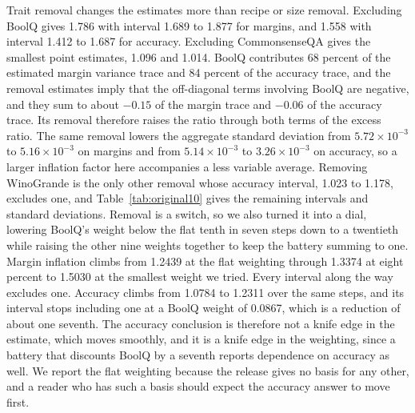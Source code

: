 Trait removal changes the estimates more than recipe or size removal. Excluding BoolQ gives 1.786 with interval 1.689 to 1.877 for margins, and 1.558 with interval 1.412 to 1.687 for accuracy. Excluding CommonsenseQA gives the smallest point estimates, 1.096 and 1.014. BoolQ contributes 68 percent of the estimated margin variance trace and 84 percent of the accuracy trace, and the removal estimates imply that the off-diagonal terms involving BoolQ are negative, and they sum to about $-0.15$ of the margin trace and $-0.06$ of the accuracy trace. Its removal therefore raises the ratio through both terms of the excess ratio. The same removal lowers the aggregate standard deviation from $5.72\times10^{-3}$ to $5.16\times10^{-3}$ on margins and from $5.14\times10^{-3}$ to $3.26\times10^{-3}$ on accuracy, so a larger inflation factor here accompanies a less variable average. Removing WinoGrande is the only other removal whose accuracy interval, 1.023 to 1.178, excludes one, and Table~\ref{tab:original10} gives the remaining intervals and standard deviations. Removal is a switch, so we also turned it into a dial, lowering BoolQ's weight below the flat tenth in seven steps down to a twentieth while raising the other nine weights together to keep the battery summing to one. Margin inflation climbs from 1.2439 at the flat weighting through 1.3374 at eight percent to 1.5030 at the smallest weight we tried. Every interval along the way excludes one. Accuracy climbs from 1.0784 to 1.2311 over the same steps, and its interval stops including one at a BoolQ weight of 0.0867, which is a reduction of about one seventh. The accuracy conclusion is therefore not a knife edge in the estimate, which moves smoothly, and it is a knife edge in the weighting, since a battery that discounts BoolQ by a seventh reports dependence on accuracy as well. We report the flat weighting because the release gives no basis for any other, and a reader who has such a basis should expect the accuracy answer to move first.

